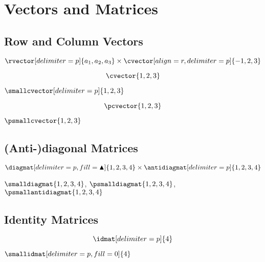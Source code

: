 \documentclass[parskip=half]{scrartcl}
\begin{document}
\section{Vectors and Matrices}

\subsection{Row and Column Vectors}

\begin{Example}[gobble=2]
  \[
    \rvector[delimiter=p]{a_{1},a_{2},a_{3}}
    \times \cvector[align=r,delimiter=p]{-1,2,3}
  \]
\end{Example}

\fulllinerule

\begin{SideBySideExample}[xrightmargin=.5\textwidth,gobble=2]
  \[
    \cvector{1,2,3}
  \]
\end{SideBySideExample}

\fulllinerule

\begin{SideBySideExample}[xrightmargin=.45\textwidth]
\(\smallcvector[delimiter=p]{1,2,3}\)
\end{SideBySideExample}

\fulllinerule

\begin{SideBySideExample}[gobble=2,xrightmargin=.5\textwidth]
  \[
    \pcvector{1,2,3}
  \]

  \(\psmallcvector{1,2,3}\)
\end{SideBySideExample}

\fulllinerule

\subsection{(Anti-)diagonal Matrices}
\begin{Example}[gobble=2]
  \[
    \diagmat[delimiter=p,fill=\blacktriangle]{1,2,3,4} \times
    \antidiagmat[delimiter=p]{1,2,3,4}
  \]
\end{Example}

\fulllinerule

\begin{Example}[gobble=2]
  \(\smalldiagmat{1,2,3,4}\),
  \(\psmalldiagmat{1,2,3,4}\),
  \(\psmallantidiagmat{1,2,3,4}\)
\end{Example}

\nopagebreak\fulllinerule

\subsection{Identity Matrices}
\begin{SideBySideExample}[xrightmargin=.45\textwidth,gobble=2]
  \[
    \idmat[delimiter=p]{4}
  \]

  \(\smallidmat[delimiter=p,fill=0]{4}\)
\end{SideBySideExample}
\end{document}
